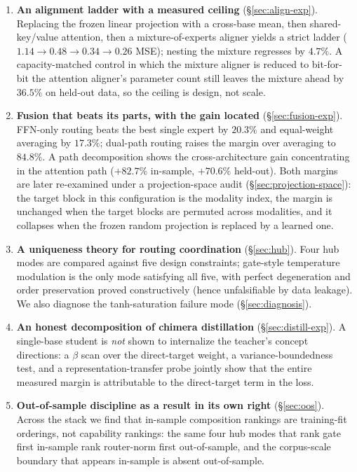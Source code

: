 \documentclass[10pt,twoside]{article}
\theoremstyle{definition}
\theoremstyle{plain}
\theoremstyle{remark}
\begin{document}
\begin{enumerate}[leftmargin=1.5em, itemsep=1pt]
    \item \textbf{An alignment ladder with a measured ceiling} (\S\ref{sec:align-exp}). Replacing the frozen linear projection with a cross-base mean, then shared-key/value attention, then a mixture-of-experts aligner yields a strict ladder ($1.14 \rightarrow 0.48 \rightarrow 0.34 \rightarrow 0.26$ MSE); nesting the mixture regresses by $4.7\%$. A capacity-matched control in which the mixture aligner is reduced to bit-for-bit the attention aligner's parameter count still leaves the mixture ahead by $36.5\%$ on held-out data, so the ceiling is design, not scale.
    \item \textbf{Fusion that beats its parts, with the gain located} (\S\ref{sec:fusion-exp}). FFN-only routing beats the best single expert by $20.3\%$ and equal-weight averaging by $17.3\%$; dual-path routing raises the margin over averaging to $84.8\%$. A path decomposition shows the cross-architecture gain concentrating in the attention path ($+82.7\%$ in-sample, $+70.6\%$ held-out). Both margins are later re-examined under a projection-space audit (\S\ref{sec:projection-space}): the target block in this configuration is the modality index, the margin is unchanged when the target blocks are permuted across modalities, and it collapses when the frozen random projection is replaced by a learned one.
    \item \textbf{A uniqueness theory for routing coordination} (\S\ref{sec:hub}). Four hub modes are compared against five design constraints; gate-style temperature modulation is the only mode satisfying all five, with perfect degeneration and order preservation proved constructively (hence unfalsifiable by data leakage). We also diagnose the tanh-saturation failure mode (\S\ref{sec:diagnosis}).
    \item \textbf{An honest decomposition of chimera distillation} (\S\ref{sec:distill-exp}). A single-base student is \emph{not} shown to internalize the teacher's concept directions: a $\beta$ scan over the direct-target weight, a variance-boundedness test, and a representation-transfer probe jointly show that the entire measured margin is attributable to the direct-target term in the loss.
    \item \textbf{Out-of-sample discipline as a result in its own right} (\S\ref{sec:oos}). Across the stack we find that in-sample composition rankings are training-fit orderings, not capability rankings: the same four hub modes that rank gate first in-sample rank router-norm first out-of-sample, and the corpus-scale boundary that appears in-sample is absent out-of-sample.
\end{enumerate}
\end{document}
